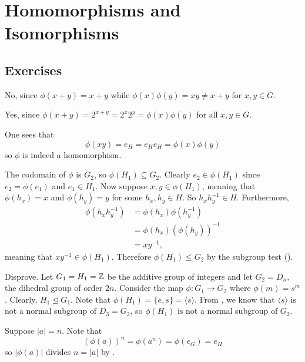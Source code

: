 \section{Homomorphisms and Isomorphisms}
\subsection*{Exercises}
\begin{questions}
    \item \begin{partquestions}{\alph*}
        \item No, since $\phi(x + y) = x + y$ while $\phi(x)\phi(y) = xy \neq x+y$ for $x, y \in G$.
        \item Yes, since $\phi(x + y) = 2^{x + y} = 2^x2^y = \phi(x)\phi(y)$ for all $x, y \in G$.
    \end{partquestions}

    \item One sees that
    \[
        \phi(xy) = e_H = e_He_H = \phi(x)\phi(y)
    \]
    so $\phi$ is indeed a homomorphism.

    \item The codomain of $\phi$ is $G_2$, so $\phi(H_1) \subseteq G_2$. Clearly $e_2 \in \phi(H_1)$ since $e_2 = \phi(e_1)$ and $e_1 \in H_1$. Now suppose $x, y \in \phi(H_1)$, meaning that $\phi(h_x) = x$ and $\phi(h_y) = y$ for some $h_x, h_y \in H$. So $h_xh_y^{-1} \in H$. Furthermore,
    \begin{align*}
        \phi(h_xh_y^{-1}) &= \phi(h_x)\phi(h_y^{-1})\\
        &= \phi(h_x)\left(\phi(h_y)\right)^{-1}\\
        &= xy^{-1},
    \end{align*}
    meaning that $xy^{-1} \in \phi(H_1)$. Therefore $\phi(H_1) \leq G_2$ by the subgroup test ().

    \item Disprove. Let $G_1 = H_1 = \mathbb{Z}$ be the additive group of integers and let $G_2 = D_n$, the dihedral group of order $2n$. Consider the map $\phi: G_1 \to G_2$ where $\phi(m) = s^m$. Clearly, $H_1 \unlhd G_1$. Note that $\phi(H_1) = \{e, s\} = \langle s \rangle$. From , we know that $\langle s \rangle$ is not a normal subgroup of $D_3 = G_2$, so $\phi(H_1)$ is not a normal subgroup of $G_2$.

    \item Suppose $|a| = n$. Note that
    \[
        \left(\phi(a)\right)^n = \phi\left(a^n\right) = \phi(e_G) = e_H
    \]
    so $|\phi(a)|$ divides $n = |a|$ by .


\end{questions}
